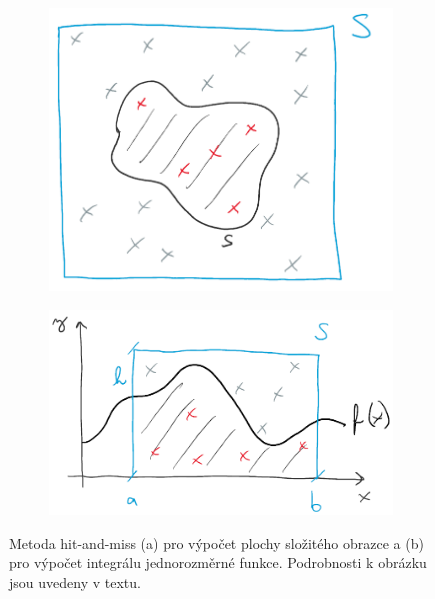 \documentclass[a4paper,11pt,twoside]{article}
\theoremstyle{red}
\theoremstyle{green}
\begin{document}
        \begin{figure}[!htbp]
            \begin{subfigure}{0.44\linewidth}
                \centering\includegraphics[width=\linewidth]{hit_and_miss.png}
                \caption{}
            \end{subfigure}
            \hfill
            \begin{subfigure}{0.54\linewidth}
                \centering\includegraphics[width=\linewidth]{hit_and_miss_int.png}
                \caption{}
            \end{subfigure}
            \caption{
                \protect\small
                Metoda hit-and-miss (a) pro výpočet plochy složitého obrazce a (b) pro výpočet integrálu jednorozměrné funkce.
                Podrobnosti k obrázku jsou uvedeny v textu. 
            }
            \label{fig:HitAndMiss}
        \end{figure}
\end{document}
